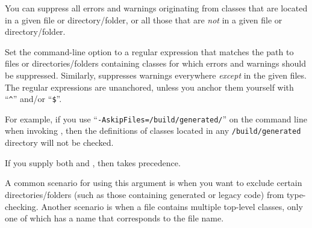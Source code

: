
You can suppress all errors and warnings originating from classes that are
located in a given file or directory/folder, or all those that are \emph{not} in a
given file or directory/folder.

Set the  command-line option to a
regular expression that matches the path to files or directories/folders containing
classes for which errors and warnings should be suppressed.
Similarly,  suppresses warnings everywhere
\emph{except} in the given files.
The regular expressions are unanchored, unless you anchor them yourself
with ``\codesize\verb|^|'' and/or ``\codesize\verb|$|''.

For example, if you use
``{\codesize\verb|-AskipFiles=/build/generated/|}'' on the command line
when invoking
, then the definitions of classes located in any
\codesize\verb|/build/generated| directory will not be checked.

If you supply both  and , then
 takes precedence.

A common scenario for using this argument is when you want to exclude certain
directories/folders (such as those containing generated or legacy code) from
type-checking.
Another scenario is when a file contains multiple top-level classes, only
one of which has a name that corresponds to the file name.


